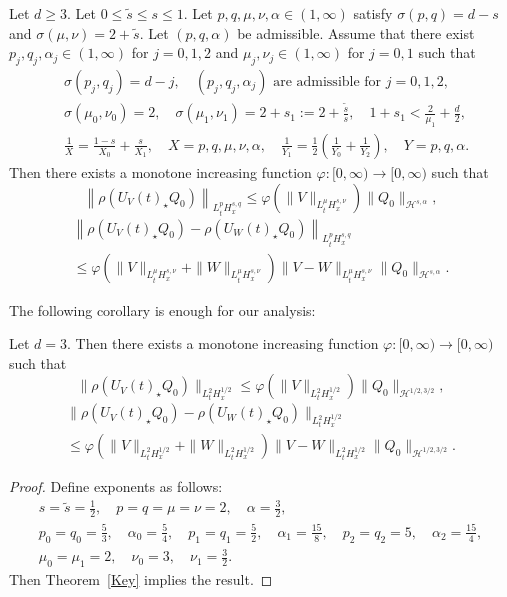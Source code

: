 \documentclass[AHL,Unicode,longabstracts,MathTools,published]{cedram}
\newcommand{\CH}{\mathcal{H}}
\newcommand{\al}{\alpha}
\newcommand{\ph}{\varphi}
\newcommand{\si}{\sigma}
\newcommand{\rh}{\rho}
\newcommand{\wt}{\widetilde}
\newcommand{\K}[1]{\left(#1\right)}
\newcommand{\I}{\infty}
\newcommand{\st}{\star}
\newcommand{\tw}{\frac{1}{2}}
\begin{document}
\begin{theo}\label{Key}
Let $d \ge 3$. Let $0 \le \wt{s} \le s \le 1$. Let $p,q,\mu,\nu,\al \in (1,\I)$ satisfy $\si(p,q)=d-s$ and $\si(\mu,\nu) = 2+\wt{s}$. Let $(p,q,\al)$ be admissible. Assume that there exist $p_j,q_j,\al_j \in (1,\I)$ for $j=0,1,2$ and $\mu_j,\nu_j \in (1,\I)$ for $j=0,1$ such that
\begin{align}
&\si(p_j,q_j) = d-j,\quad (p_j,q_j,\al_j) \text{ are admissible for } j=0,1,2, \\
&\si(\mu_0,\nu_0) = 2, \quad \si (\mu_1,\nu_1) = 2+s_1 := 2 + \frac{\wt{s}}{s}, \quad 1+s_1 < \frac{2}{\mu_1}+\frac{d}{2},\\
&\frac{1}{X} = \frac{1-s}{X_0} + \frac{s}{X_1}, \quad X = p,q,\mu,\nu,\al,
\quad \frac{1}{Y_1} = \frac{1}{2} \K{\frac{1}{Y_0} + \frac{1}{Y_2}}, \quad Y=p,q,\al.
\end{align}
Then there exists a monotone increasing function $\ph:[0,\I) \to [0,\I)$ such that
\begin{equation}\label{g stri}
\left\|\rh(U_V(t)_\st Q_0)\right\|_{L^p_t H^{s,q}_x}
\le \ph(\|V\|_{L^{\mu}_t H^{s,\nu}_x})
\|Q_0\|_{\CH^{s,\al}}, 
\end{equation}
\begin{multline}\label{diff g stri}
\left\|\rh(U_V(t)_\st Q_0) - \rh(U_W(t)_\st Q_0)\right\|_{L^p_t H^{s,q}_x} \\
\le \ph\left(\|V\|_{L^{\mu}_t H^{s,\nu}_x} + \|W\|_{L^{\mu}_t H^{s,\nu}_x}\right)
\|V-W\|_{L^\mu_t H^{s,\nu}_x}
\|Q_0\|_{\CH^{s,\al}}. 
\end{multline}
\end{theo}

The following corollary is enough for our analysis:

\begin{coro} \label{key cor}
Let $d=3$. Then there exists a monotone increasing function $\ph:[0,\I) \to [0,\I)$ such that
\begin{equation}
\|\rh(U_V(t)_\st Q_0) \|_{L^2_t H^{1/2}_x} \le \ph\left(\|V\|_{L^2_t H^{1/2}_x}\right) \|Q_0\|_{\CH^{1/2,3/2}},
\end{equation}
\begin{multline}
\big\|\rh(U_V(t)_\st Q_0) - \rh(U_W(t)_\st Q_0)\big\|_{L^2_t H^{1/2}_x} \\
 \le \ph\left(\|V\|_{L^2_t H^{1/2}_x} + \|W\|_{L^2_t H^{1/2}_x}\right)
\|V-W\|_{L^2_t H^{1/2}_x}
\|Q_0\|_{\CH^{1/2,3/2}}.
\end{multline}
\end{coro}
\begin{proof}
Define exponents as follows:
\begin{gather}
s =\wt{s}=\tw, \quad p=q=\mu=\nu=2, \quad \al=\frac{3}{2}, \\
p_0 = q_0 = \frac{5}{3}, \quad \al_0 = \frac{5}{4},
\quad p_1=q_1=\frac{5}{2}, \quad \al_1 = \frac{15}{8},
\quad p_2=q_2=5, \quad \al_2=\frac{15}{4}, \\
\mu_0 = \mu_1=2, \quad \nu_0 = 3, \quad \nu_1 = \frac{3}{2}.
\end{gather}
Then Theorem~\ref{Key} implies the result.
\end{proof}
\end{document}
